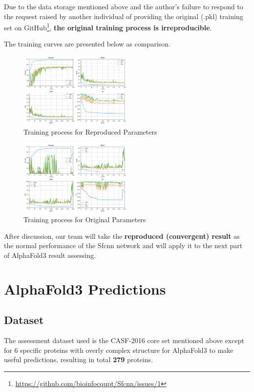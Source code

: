 \documentclass[unnumsec,webpdf,contemporary,large]{oup-authoring-template}
\theoremstyle{thmstyleone}%
\theoremstyle{thmstyletwo}%
\theoremstyle{thmstylethree}%
\begin{document}
Due to the data storage mentioned above and the author's failure to respond to the request raised by another individual of providing the original (.pkl) training set on GitHub\footnote{\url{https://github.com/bioinfocqupt/Sfcnn/issues/1}}, \textbf{the original training process is irreproducible}.

The training curves are presented below as comparison.

\begin{figure}[!t]
    \centering
    \includegraphics[width=0.5\textwidth]{images/normal_converge.png}
    \caption{Training process for Reproduced Parameters}
    \label{fig:ReproducedPlot}
\end{figure}

\begin{figure}[!t]
    \centering
    \includegraphics[width=0.5\textwidth]{images/origin_param.png}
    \caption{Training process for Original Parameters}
    \label{fig:OriginalPlot}
\end{figure}

After discussion, our team will take the \textbf{reproduced (convergent) result} as the normal performance of the Sfcnn network and will apply it to the next part of AlphaFold3 result assessing.

\section{AlphaFold3 Predictions}

\subsection{Dataset}
The assessment dataset used is the CASF-2016 core set mentioned above except for 6 specific proteins with overly complex structure for AlphaFold3 to make useful predictions, resulting in total \textbf{279} proteins.
\end{document}

